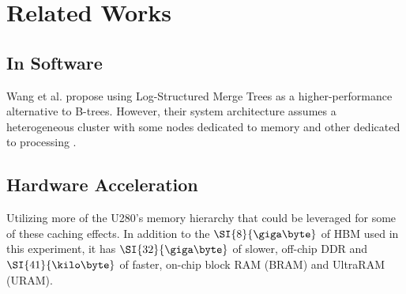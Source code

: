 \chapter{Related Works}

\section{In Software}

Wang et al. propose using Log-Structured Merge Trees as a higher-performance alternative to B-trees. However, their system architecture assumes a heterogeneous cluster with some nodes dedicated to memory and other dedicated to processing \cite{dlsm}.


\section{Hardware Acceleration}

Utilizing more of the U280's memory hierarchy that could be leveraged for some of these caching effects. In addition to the $\SI{8}{\giga\byte}$ of HBM used in this experiment, it has $\SI{32}{\giga\byte}$ of slower, off-chip DDR and $\SI{41}{\kilo\byte}$ of faster, on-chip block RAM (BRAM) and UltraRAM (URAM).
